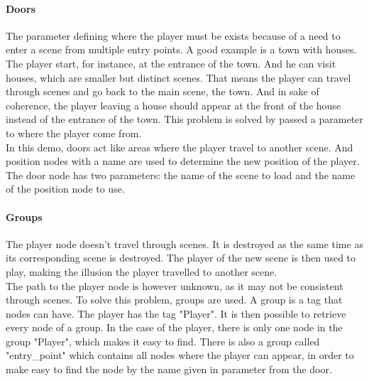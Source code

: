 \documentclass[10pt,a4paper]{article}
\begin{document}
\paragraph{Doors}
The parameter defining where the player must be exists because of a need to enter a scene from multiple entry points. A good example is a town with houses. The player start, for instance, at the entrance of the town. And he can visit houses, which are smaller but distinct scenes. That means the player can travel through scenes and go back to the main scene, the town. And in sake of coherence, the player leaving a house should appear at the front of the house instead of the entrance of the town. This problem is solved by passed a parameter to where the player come from.\\
In this demo, doors act like areas where the player travel to another scene. And position nodes with a name are used to determine the new position of the player. The door node has two parameters: the name of the scene to load and the name of the position node to use.
\paragraph{Groups}
The player node doesn't travel through scenes. It is destroyed as the same time as its corresponding scene is destroyed. The player of the new scene is then used to play, making the illusion the player travelled to another scene.\\
The path to the player node is however unknown, as it may not be consistent through scenes. To solve this problem, groups are used. A group is a tag that nodes can have. The player has the tag "Player". It is then possible to retrieve every node of a group. In the case of the player, there is only one node in the group "Player", which makes it easy to find. There is also a group called "entry\_point" which contains all nodes where the player can appear, in order to make easy to find the node by the name given in parameter from the door. 
\end{document}
